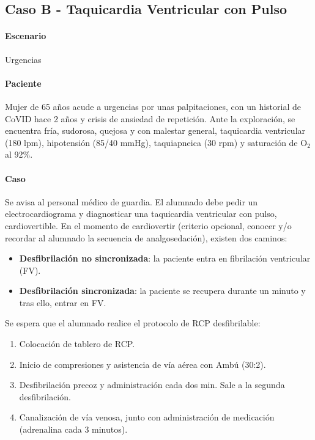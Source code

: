 \subsection{Caso B - Taquicardia Ventricular con Pulso}
\paragraph{Escenario} Urgencias
\vspace{-12.5pt}
\paragraph{Paciente} Mujer de 65 años acude a urgencias por unas palpitaciones, con un historial de CoVID hace 2 años y crisis de ansiedad de repetición. Ante la exploración, se encuentra fría, sudorosa, quejosa y con malestar general, taquicardia ventricular (180 lpm), hipotensión (85/40 mmHg), taquiapneica (30 rpm) y saturación de O$_2$ al 92\%.
\vspace{-12.5pt}
\paragraph{Caso} Se avisa al personal médico de guardia. El alumnado debe pedir un electrocardiograma y diagnosticar una taquicardia ventricular con pulso, cardiovertible. En el momento de cardiovertir (criterio opcional, conocer y/o recordar al alumnado la secuencia de analgosedación), existen dos caminos:
    \begin{itemize}[topsep=0pt, partopsep=0pt,itemsep=0pt,parsep=0pt]
        \item \textbf{Desfibrilación no sincronizada}: la paciente entra en fibrilación ventricular (FV).
        \item \textbf{Desfibrilación sincronizada}: la paciente se recupera durante un minuto y tras ello, entrar en FV.
    \end{itemize}
Se espera que el alumnado realice el protocolo de RCP desfibrilable:
\begin{enumerate}[topsep=0pt, partopsep=0pt,itemsep=0pt,parsep=0pt]
    \item Colocación de tablero de RCP.
    \item Inicio de compresiones y asistencia de vía aérea con Ambú (30:2).
    \item Desfibrilación precoz y administración cada dos min. Sale a la segunda desfibrilación.
    \item Canalización de vía venosa, junto con administración de medicación (adrenalina cada 3 minutos).
\end{enumerate}
\vspace{-12.5pt}
